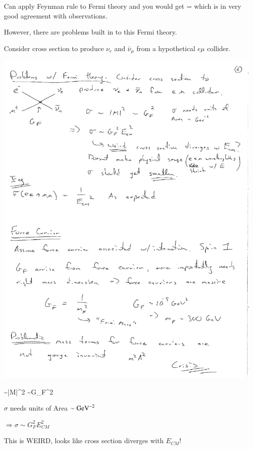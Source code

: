 {Can apply Feynman rule to Fermi theory and you would get 
\be
\Gamma = 
\ee
which is in very good agreement with observations.

However, there are problems built in to this Fermi theory.

Consider cross section to produce $\nu_e$ and $\bar{\nu}_\mu$ from a hypothetical $e\mu$ collider.

\begin{minipage}{0.4\textwidth}
\bc
\includegraphics[width=1.0\textwidth]{./emuCollider.pdf}
\ec
\end{minipage} \hfill
\begin{minipage}{0.6\textwidth}
\be
\sigma \sim |M|^2 \sim G_F^2
\ee

\bc
$\sigma$ needs units of Area $\sim \textrm{GeV}^{-2}$

$\Rightarrow \sigma \sim G_F^2 E_{CM}^2$ 
\ec
\end{minipage}

This is WEIRD, looks like cross section diverges with $E_{CM}$!

}
